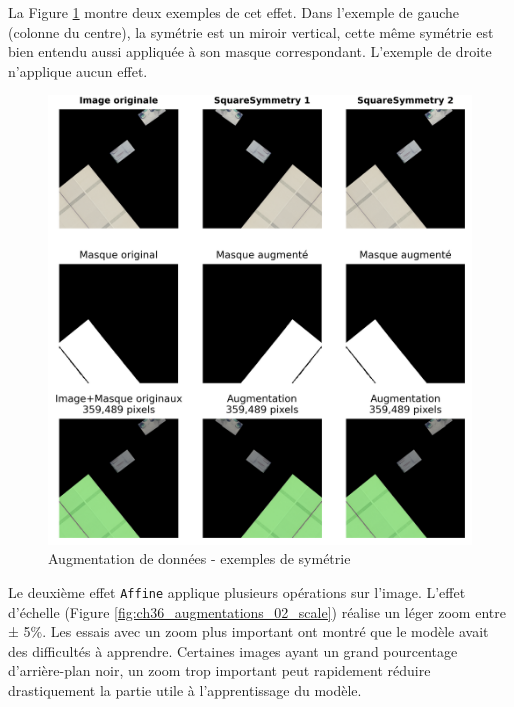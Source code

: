 La Figure \ref{fig:ch36_augmentations_01_squaresymmetry} montre deux exemples de cet effet. Dans l'exemple de gauche (colonne du centre), la symétrie est un miroir vertical, cette même symétrie est bien entendu aussi appliquée à son masque correspondant. L'exemple de droite n'applique aucun effet.

\begin{figure}[H]
    \centering
    \includegraphics[width=1\linewidth]{02-main/figures/ch3/ch36_augmentations_01_squaresymmetry.png}
    \caption{Augmentation de données - exemples de symétrie}
    \label{fig:ch36_augmentations_01_squaresymmetry}
\end{figure}

\newpage
Le deuxième effet \texttt{Affine} applique plusieurs opérations sur l'image. L'effet d'échelle (Figure \ref{fig:ch36_augmentations_02_scale}) réalise un léger zoom entre ± 5\%. Les essais avec un zoom plus important ont montré que le modèle avait des difficultés à apprendre. Certaines images ayant un grand pourcentage d'arrière-plan noir, un zoom trop important peut rapidement réduire drastiquement la partie utile à l'apprentissage du modèle.

